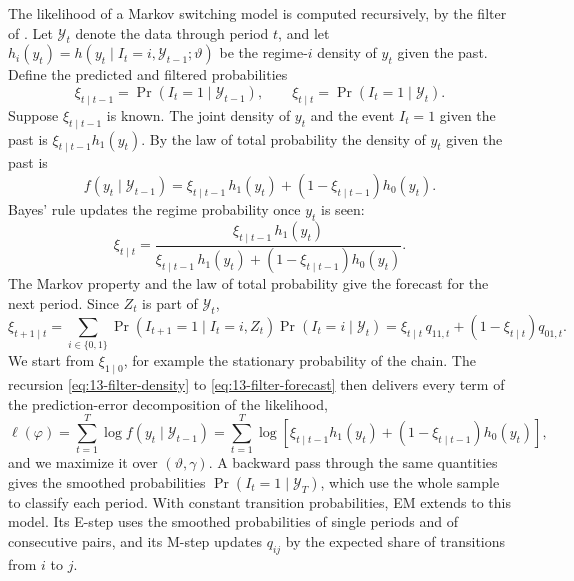 The likelihood of a Markov switching model is computed recursively, by the filter of \citet{Hamilton1989}. Let
$\mathcal{Y}_t$ denote the data through period $t$, and let $h_i(y_t) = h(y_t\mid I_t = i, \mathcal{Y}_{t-1};
\vartheta)$ be the regime-$i$ density of $y_t$ given the past. Define the predicted and filtered probabilities
\begin{equation*}
  \xi_{t\mid t-1} = \Pr(I_t = 1 \mid \mathcal{Y}_{t-1}), \qquad \xi_{t\mid t} = \Pr(I_t = 1\mid \mathcal{Y}_t).
\end{equation*}
Suppose $\xi_{t\mid t-1}$ is known. The joint density of $y_t$ and the event $I_t = 1$ given the past is
$\xi_{t\mid t-1}h_1(y_t)$. By the law of total probability the density of $y_t$ given the past is
\begin{equation}\label{eq:13-filter-density}
  f(y_t \mid \mathcal{Y}_{t-1}) = \xi_{t\mid t-1}\,h_1(y_t) + \left(1 - \xi_{t\mid t-1}\right)h_0(y_t).
\end{equation}
Bayes' rule updates the regime probability once $y_t$ is seen:
\begin{equation}\label{eq:13-filter-update}
  \xi_{t\mid t} = \frac{\xi_{t\mid t-1}\,h_1(y_t)}{\xi_{t\mid t-1}\,h_1(y_t) + \left(1 - \xi_{t\mid t-1}\right)h_0(y_t)} .
\end{equation}
The Markov property and the law of total probability give the forecast for the next period. Since $Z_t$ is part of
$\mathcal{Y}_t$,
\begin{equation}\label{eq:13-filter-forecast}
  \xi_{t+1\mid t} = \sum_{i\in\{0,1\}}\Pr(I_{t+1} = 1\mid I_t = i, Z_t)\Pr(I_t = i \mid \mathcal{Y}_t)
  = \xi_{t\mid t}\, q_{11,t} + \left(1 - \xi_{t\mid t}\right) q_{01,t} .
\end{equation}
We start from $\xi_{1\mid 0}$, for example the stationary probability of the chain. The recursion
\eqref{eq:13-filter-density} to \eqref{eq:13-filter-forecast} then delivers every term of the prediction-error
decomposition of the likelihood,
\begin{equation}\label{eq:13-markov-loglik}
  \ell(\varphi) = \sum_{t=1}^T \log f(y_t\mid\mathcal{Y}_{t-1})
  = \sum_{t=1}^T \log\left[\xi_{t\mid t-1}h_1(y_t) + \left(1 - \xi_{t\mid t-1}\right)h_0(y_t)\right],
\end{equation}
and we maximize it over $(\vartheta, \gamma)$. A backward pass through the same quantities gives the smoothed
probabilities $\Pr(I_t = 1 \mid \mathcal{Y}_T)$, which use the whole sample to classify each period. With constant
transition probabilities, EM extends to this model. Its E-step uses the smoothed probabilities of single periods and
of consecutive pairs, and its M-step updates $q_{ij}$ by the expected share of transitions from $i$ to $j$.

